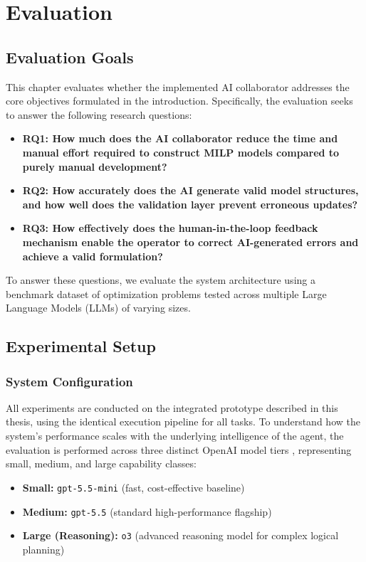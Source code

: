 \chapter{Evaluation}

\section{Evaluation Goals}
This chapter evaluates whether the implemented AI collaborator addresses the core objectives formulated in the introduction. Specifically, the evaluation seeks to answer the following research questions:
\begin{itemize}
    \item \textbf{RQ1: How much does the AI collaborator reduce the time and manual effort required to construct MILP models compared to purely manual development?}
    \item \textbf{RQ2: How accurately does the AI generate valid model structures, and how well does the validation layer prevent erroneous updates?}
    \item \textbf{RQ3: How effectively does the human-in-the-loop feedback mechanism enable the operator to correct AI-generated errors and achieve a valid formulation?}
\end{itemize}


To answer these questions, we evaluate the system architecture using a benchmark dataset of optimization problems tested across multiple Large Language Models (LLMs) of varying sizes.

\section{Experimental Setup}
\subsection{System Configuration}
All experiments are conducted on the integrated prototype described in this thesis, using the identical execution pipeline for all tasks. To understand how the system's performance scales with the underlying intelligence of the agent, the evaluation is performed across three distinct OpenAI model tiers \cite{openaiCompareModels}, representing small, medium, and large capability classes:
\begin{itemize}
    \item \textbf{Small:} \texttt{gpt-5.5-mini} (fast, cost-effective baseline)
    \item \textbf{Medium:} \texttt{gpt-5.5} (standard high-performance flagship)
    \item \textbf{Large (Reasoning):} \texttt{o3} (advanced reasoning model for complex logical planning)
\end{itemize}


